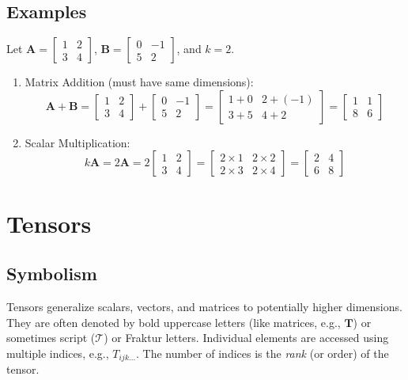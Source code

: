 \documentclass{article}
\newcommand{\mat}[1]{\bm{#1}}  %
\begin{document}
\subsection*{Examples}
Let $\mat{A} = \begin{bmatrix} 1 & 2 \\ 3 & 4 \end{bmatrix}$, $\mat{B} = \begin{bmatrix} 0 & -1 \\ 5 & 2 \end{bmatrix}$, and $k = 2$.
\begin{enumerate}
    \item Matrix Addition (must have same dimensions):
    \[ \mat{A} + \mat{B} = \begin{bmatrix} 1 & 2 \\ 3 & 4 \end{bmatrix} + \begin{bmatrix} 0 & -1 \\ 5 & 2 \end{bmatrix} = \begin{bmatrix} 1+0 & 2+(-1) \\ 3+5 & 4+2 \end{bmatrix} = \begin{bmatrix} 1 & 1 \\ 8 & 6 \end{bmatrix} \]
    \item Scalar Multiplication:
    \[ k\mat{A} = 2 \mat{A} = 2 \begin{bmatrix} 1 & 2 \\ 3 & 4 \end{bmatrix} = \begin{bmatrix} 2 \times 1 & 2 \times 2 \\ 2 \times 3 & 2 \times 4 \end{bmatrix} = \begin{bmatrix} 2 & 4 \\ 6 & 8 \end{bmatrix} \]
\end{enumerate}

\section{Tensors}

\subsection*{Symbolism}
Tensors generalize scalars, vectors, and matrices to potentially higher dimensions. They are often denoted by bold uppercase letters (like matrices, e.g., $\mat{T}$) or sometimes script ($\mathcal{T}$) or Fraktur letters. Individual elements are accessed using multiple indices, e.g., $T_{ijk...}$. The number of indices is the \emph{rank} (or order) of the tensor.
\end{document}

